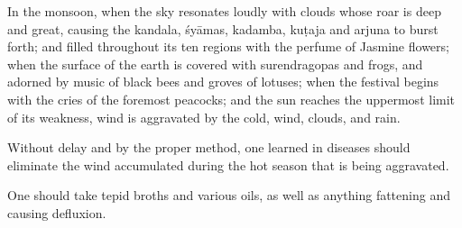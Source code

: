 \begin{translation}
	\item[62--65] %
	In the monsoon, %
	when the sky %
	resonates loudly %
	with clouds whose roar is deep and great,  %
	causing the \gls{kandala}, %
	\glspl{śyāma}, %
	\gls{kadamba}, %
	\gls{kuṭaja} %
	and \gls{arjuna} to burst forth; %
	and filled %
	throughout its ten regions  %
	with the perfume of Jasmine flowers;%
	when the surface of the earth %
	is covered %
	with \glspl{surendragopa} %
	and frogs, %
	and adorned by %
	music of black bees %
	and groves of lotuses;
	when the festival begins with the cries of the foremost peacocks; %
	and the sun reaches the uppermost limit of its weakness, %
	wind is aggravated by the cold, wind, clouds, and rain.

	\item[66]
	Without delay %
	and by the proper method, %
	one learned in diseases %
	should eliminate %
	the wind accumulated during the hot season %
	that is being aggravated. %

	\item[67]
	One should take %
	tepid %
	broths %
	and various oils, %
	as well as anything fattening %
	and causing defluxion. %


\end{translation}
